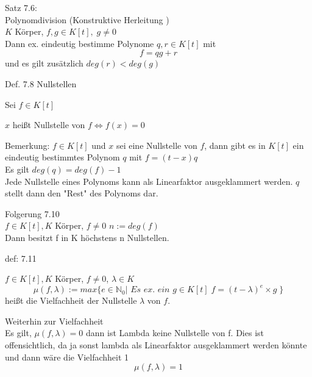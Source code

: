\documentclass[smallheadings,12pt,a4paper]{scrartcl}
\begin{document}
\item Satz 7.6: \\
Polynomdivision (Konstruktive Herleitung )\\
$K$ Körper, $f,g \in K[t], \; g \neq 0 $ \\
Dann ex. eindeutig bestimme Polynome $q,r \in K[t]$ mit \\

$$ f = qg+r $$ und es gilt zusätzlich $ deg(r) < deg(g) $  \\

\newpage

\begin{center}
\item[ Def. 7.8 Nullstellen]
\end{center}
\item Sei $f \in K[t]$  \\
\item $x$ heißt Nullstelle von $f \Leftrightarrow f(x)=0 $\\

\item Bemerkung:
$f \in K[t]$ und $x$ sei eine Nullstelle von $f$, dann gibt es in $K[t]$ ein eindeutig bestimmtes Polynom $q$ mit $f=(t-x)q$ \\
Es gilt $deg(q) = deg(f)-1$ \\

Jede Nullstelle eines Polynoms kann als Linearfaktor ausgeklammert werden. $q$ stellt dann den "Rest" des Polynoms dar. \\

\item Folgerung 7.10 \\
$f \in K[t],K$ Körper, $ f \neq 0 $   $ n := deg(f)$ \\

Dann besitzt f in K höchstens n Nullstellen.

\item[def: 7.11]
\item $f \in K[t],K$ Körper, $ f \neq 0 $, $\lambda \in K$ \\
$$\mu(f,\lambda):=max\{e \in \mathbb{N}_0 | \textit{ Es ex. ein } g \in K[t] \; f = (t-\lambda)^{e} \times g  \; \} $$ heißt die Vielfachheit der Nullstelle $\lambda $ von $f$.

\newpage

\item Weiterhin zur Vielfachheit \\
Es gilt, $\mu(f,\lambda) = 0$ dann ist Lambda keine Nullstelle von f. Dies ist offensichtlich, da ja sonst lambda als Linearfaktor ausgeklammert werden könnte und dann wäre die Vielfachheit 1 
$$\mu(f,\lambda) = 1 $$ 
\end{document}
